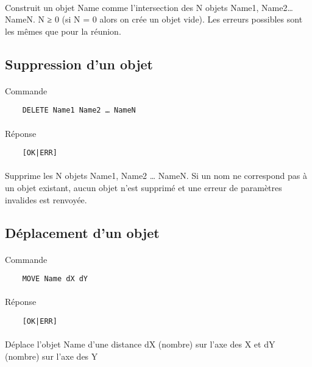 \paragraph{}
Construit un objet Name comme l'intersection des N objets Name1, Name2… NameN. N ≥ 0 (si N = 0 alors on crée un objet vide). Les erreurs possibles sont les mêmes que pour la réunion.

\subsection{Suppression d'un objet}
 \paragraph{}
Commande
\begin{lstlisting}
	DELETE Name1 Name2 … NameN
\end{lstlisting}
\paragraph{}
Réponse
\begin{lstlisting}
	[OK|ERR]
\end{lstlisting}
\paragraph{}
Supprime les N objets Name1, Name2 … NameN. Si un nom ne correspond pas à un objet existant, aucun objet n'est supprimé et une erreur de paramètres invalides est renvoyée.

\subsection{Déplacement d'un objet}
 \paragraph{}
Commande
\begin{lstlisting}
	MOVE Name dX dY
\end{lstlisting}
\paragraph{}
Réponse
\begin{lstlisting}
	[OK|ERR]
\end{lstlisting}
\paragraph{}
Déplace l'objet Name d'une distance dX (nombre) sur l'axe des X et dY (nombre) sur l'axe des Y

